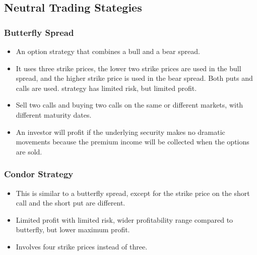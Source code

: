 \subsection{Neutral Trading Stategies}
\subsubsection{Butterfly Spread}
\begin{itemize}
\item  An option strategy that combines a bull and a bear spread. 
\item It uses three strike prices,
the lower two strike prices are used in the bull spread, and the higher strike price is used in the bear spread. Both puts and calls are used.
\itemThe strategy has limited risk, but limited profit.

\item Sell two calls and buying two calls on the same or different markets, with different maturity dates.

\item An investor will profit if the underlying security makes no dramatic movements because the premium income will be collected when the options are sold.
\end{itemize}
\subsubsection*{Condor Strategy}
\begin{itemize}
\item This is similar to a butterfly spread, except for the strike price on the short call and the short put are different.

\item Limited profit with limited risk, wider profitability range compared to butterfly, but lower maximum profit.

\item Involves four strike prices instead of three.
\end{itemize}
